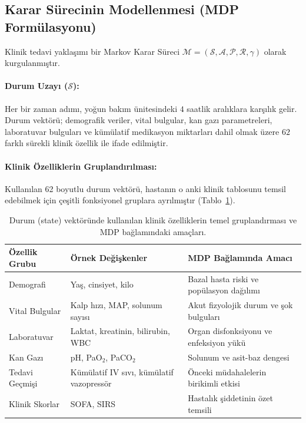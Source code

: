 \documentclass[11pt,a4paper]{article}
\begin{document}
\subsection{Karar Sürecinin Modellenmesi (MDP Formülasyonu)}
Klinik tedavi yaklaşımı bir Markov Karar Süreci $\mathcal{M} = (\mathcal{S}, \mathcal{A}, \mathcal{P}, \mathcal{R}, \gamma)$ olarak kurgulanmıştır.

\paragraph{Durum Uzayı ($\mathcal{S}$):} Her bir zaman adımı, yoğun bakım ünitesindeki $4$ saatlik aralıklara karşılık gelir. Durum vektörü; demografik veriler, vital bulgular, kan gazı parametreleri, laboratuvar bulguları ve kümülatif medikasyon miktarları dahil olmak üzere $62$ farklı sürekli klinik özellik ile ifade edilmiştir.

\paragraph{Klinik Özelliklerin Gruplandırılması:} 
Kullanılan 62 boyutlu durum vektörü, hastanın o anki klinik tablosunu temsil edebilmek için çeşitli fonksiyonel gruplara ayrılmıştır (Tablo~\ref{tab:feature_groups}).

\begin{table}[H]
\centering
\caption{Durum (state) vektöründe kullanılan klinik özelliklerin temel gruplandırması ve MDP bağlamındaki amaçları.}
\label{tab:feature_groups}
\begin{tabular}{lll}
\toprule
\textbf{Özellik Grubu} & \textbf{Örnek Değişkenler} & \textbf{MDP Bağlamında Amacı} \\
\midrule
Demografi & Yaş, cinsiyet, kilo & Bazal hasta riski ve popülasyon dağılımı \\
Vital Bulgular & Kalp hızı, MAP, solunum sayısı & Akut fizyolojik durum ve şok bulguları \\
Laboratuvar & Laktat, kreatinin, bilirubin, WBC & Organ disfonksiyonu ve enfeksiyon yükü \\
Kan Gazı & pH, PaO$_2$, PaCO$_2$ & Solunum ve asit-baz dengesi \\
Tedavi Geçmişi & Kümülatif IV sıvı, kümülatif vazopressör & Önceki müdahalelerin birikimli etkisi \\
Klinik Skorlar & SOFA, SIRS & Hastalık şiddetinin özet temsili \\
\bottomrule
\end{tabular}
\end{table}
\end{document}
